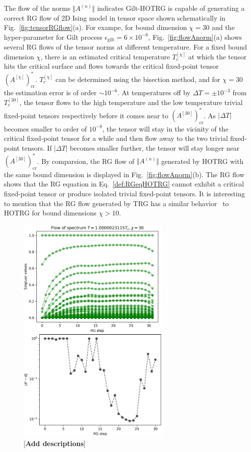 \documentclass[aps,prb,reprint,superscriptaddress]{revtex4-2}
\begin{document}
The flow of the norms $\Vert A^{(n)} \Vert$ indicates Gilt-HOTRG is
capable of generating a correct RG flow of 2D Ising model in tensor
space shown schematically in Fig.~\ref{fig:tensorRGflow}(a). For exampe,
for bound dimension $\chi = 30$ and the hyper-parameter for Gilt process
$\epsilon_{\text{gilt}} = 6\times 10^{-6}$, Fig.~\ref{fig:flowAnorm}(a)
shows several RG flows of the tensor norms at different temperature. For
a fixed bound dimension $\chi$, there is an estimated critical
temperature $T_c^{[\chi]}$ at which the tensor
hits the critical surface and flows towards the critical fixed-point
tensor $(A^{[\chi]})^*_{\text{cr}}$. $T_c^{[\chi]}$ can be determined
using the bisection method, and for $\chi = 30$ the estimation error is
of order $\sim 10^{-6}$. At temperatures off by $\Delta T = \pm 10^{-3}$
from $T_c^{[30]}$, the tensor flows to the high temperature and the
low temperature trivial fixed-point tensors respectively before it comes
near to $(A^{[30]})^*_{\text{cr}}$. As $|\Delta T|$ becomes smaller to
order of $10^{-8}$, the tensor will stay in the vicinity of the critical
fixed-point tensor for a while and then flow away to the two trivial
fixed-point tensors. If $|\Delta T|$ becomes smaller further, the tensor
will stay longer near $(A^{[30]})^*_{\text{cr}}$. By comparsion, the
RG flow of $\Vert A^{(n)}\Vert$ generated by HOTRG with the same bound
dimension is displayed in Fig.~\ref{fig:flowAnorm}(b). The RG flow shows
that the RG equation in Eq.~\eqref{def:RGeqHOTRG} cannot exhibit a
critical fixed-point tensor or produce isolated trivial fixed-point
tensors. It is interesting to mention that the RG flow generated by TRG
has a similar behavior~\cite{Berker2008} to HOTRG for bound dimensions
$\chi > 10$.
\begin{figure}[htb]
    \includegraphics[width=7.5cm]{./figs/flowA}
    \caption{\label{fig:flowA}[\textbf{Add descriptions}]}
\end{figure}
%
\end{document}
